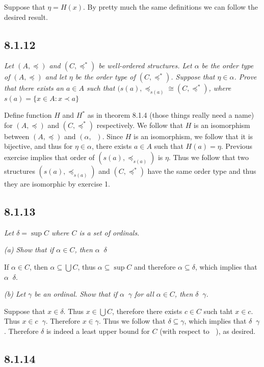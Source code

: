 \documentclass[11pt,oneside,titlepage]{book}
\DeclareMathOperator \ineq {\underline{\in}}
\newcommand{\set}[1]{\{ #1 \}}
\begin{document}
Suppose that $\eta = H(x)$. By pretty much the same definitions we can follow the desired
result.

\subsection*{8.1.12}

\textit{Let $(A, \preceq)$ and $(C, \preceq^*)$ be well-ordered structures. Let $\alpha$
  be the order type of $(A, \preceq)$ and let $\eta$ be the order type of $(C, \preceq^*)$.
  Suppose that $\eta \in \alpha$. Prove that there exists an $a \in A$ such that
  $(s(a), \preceq_{s(a)} \cong (C, \preceq^*)$, where $s(a) = \set{x \in A: x \prec a}$}

Define function $H$ and $H^*$ as in theorem 8.1.4 (those things really need a name)
for $(A, \preceq)$ and $(C, \preceq^*)$
respectively. We follow that $H$ is an isomorphism between $(A, \preceq)$ and
$(\alpha, \ineq)$. Since $H$ is an isomorphism, we follow that it is bijective,
and thus for $\eta \in \alpha$, there exists $a \in A$ such that
$H(a) = \eta$. Previous exercise implies that order of  $(s(a), \preceq_{s(a)})$ is
$\eta$. Thus we follow that two structures $(s(a), \preceq_{s(a)})$ and
$(C, \preceq^*)$ have the same order type and thus they are isomorphic by exercise 1.


\subsection*{8.1.13}

\textit{Let $\delta = \sup{C}$ where $C$ is a set of ordinals. }

\textit{(a) Show that if $\alpha \in C$, then $\alpha \ineq \delta$}

If $\alpha \in C$, then $\alpha \subseteq \bigcup{C}$, thus $\alpha \subseteq \sup{C}$
and therefore $\alpha \subseteq \delta$, which implies that $\alpha \ineq \delta$.

\textit{(b) Let $\gamma$ be an ordinal. Show that if $\alpha \ineq \gamma$ for
  all $\alpha \in C$, then $\delta \ineq \gamma$.}

Suppose that $x \in \delta$. Thus $x \in \bigcup{C}$, therefore
there exists $c \in C$ such taht $x \in c$. Thus $x \in c \ineq \gamma$. Therefore
$x \in \gamma$. Thus we follow that $\delta \subseteq \gamma$, which implies that
$\delta \ineq \gamma$. Therefore $\delta$ is indeed a least upper bound for $C$
(with respect to $\ineq$), as desired.

\subsection*{8.1.14}
\end{document}
